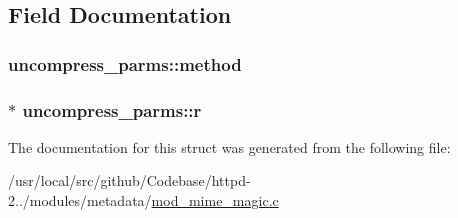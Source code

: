 \subsection{Field Documentation}
\subsubsection[{\texorpdfstring{method}{method}}]{ uncompress\+\_\+parms\+::method}\hypertarget{structuncompress__parms_a1d90e541ca57d8a7e5bf8c0a2d074544}{}\label{structuncompress__parms_a1d90e541ca57d8a7e5bf8c0a2d074544}
\subsubsection[{\texorpdfstring{r}{r}}]{$\ast$ uncompress\+\_\+parms\+::r}\hypertarget{structuncompress__parms_af09392302ab3d5bdcea149654ee0dd39}{}\label{structuncompress__parms_af09392302ab3d5bdcea149654ee0dd39}


The documentation for this struct was generated from the following file\+:\begin{DoxyCompactItemize}
\item 
/usr/local/src/github/\+Codebase/httpd-\/2../modules/metadata/\hyperlink{mod__mime__magic_8c}{mod\+\_\+mime\+\_\+magic.\+c}\end{DoxyCompactItemize}

